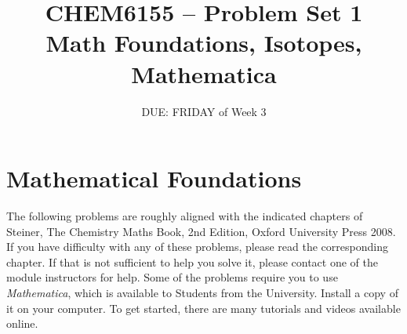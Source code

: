 \documentclass{chem6155problemset}
\title{CHEM6155 -- Problem Set 1\\Math Foundations, Isotopes, Mathematica}
\date{DUE: FRIDAY of Week 3}
\begin{document}
\maketitle

\section{Mathematical Foundations}
The following problems are roughly aligned with the indicated chapters of Steiner, The Chemistry
Maths Book, 2nd Edition, Oxford University Press 2008. If you have difficulty with any
of these problems, please read the corresponding chapter. If that is not sufficient
to help you solve it, please contact one of the module instructors for help. Some of the problems
require you to use \emph{Mathematica}, which is available to Students from the University. 
Install a copy of it on your computer. To get started, there are many tutorials and videos
available online.
\end{document}
